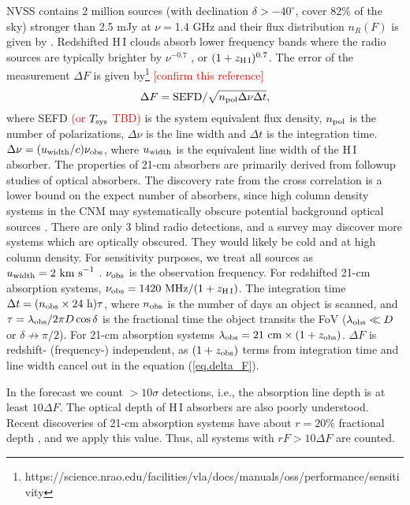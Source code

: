 \documentclass[]{raa}
\newcommand{\HI}{{H{\small\,I}}}
\newcommand{\tcr}{\textcolor{red}}
\begin{document}
NVSS contains 2 million sources (with declination $\delta >-40^\circ$,
cover 82\% of the sky) stronger than 2.5
mJy at $\nu=$1.4 GHz \citep{1998AJ....115.1693C} and their flux
distribution $n_R(F)$ is given by \cite{1984ApJ...287..461C}.
Redshifted {\HI} clouds absorb lower frequency bands where
the radio sources are typically brighter by $\nu^{-0.7}$
\citep{1998AJ....115.1693C}, or $(1+z_{\rm \HI})^{0.7}$.
The error of the measurement $\Delta F$ is given by\footnote{https://science.nrao.edu/facilities/vla/docs/manuals/oss/performance/sensitivity} \tcr{[confirm this reference]}
\begin{equation}\label{eq.delta_F}
    \Delta F={\rm SEFD}/\sqrt{n_{\rm pol}\Delta\nu\Delta t},
\end{equation}
where SEFD \tcr{(or $T_{\rm sys}$ TBD)} is the system equivalent flux density, $n_{\rm pol}$
is the number of polarizations, $\Delta\nu$ is the line width and
$\Delta t$ is the integration time. $\Delta\nu=(u_{\rm width}/c)\nu_{\rm obs}$,
where $u_{\rm width}$ is the equivalent line width of the {\HI}
absorber. The properties of 21-cm absorbers are primarily derived from
followup studies of optical absorbers. The discovery rate from the
cross correlation is a lower bound on the expect number of absorbers,
since high column density systems in the CNM may systematically
obscure potential background optical sources \citep{2014PhRvL.113d1303Y}. There are
only 3 blind radio detections, and a survey may discover more systems
which are optically obscured. They would likely be cold and at high
column density. For sensitivity purposes, we treat all sources as
$u_{\rm width}=2\ {\rm km\ s}^{-1}$
\citep{1982ApJ...259..495W,2005ARA&A..43..861W}.
$\nu_{\rm obs}$ is the observation frequency. For redshifted
21-cm absorption systems, $\nu_{\rm obs}=1420\ {\rm MHz}/(1+z_{\rm \HI})$.
The integration time $\Delta t=(n_{\rm obs}\times 24\ {\rm h})\tau$,
where $n_{\rm obs}$ is the number of days an object is scanned,
and $\tau=\lambda_{\rm obs}/2\pi D\cos\delta$ is the fractional time the object
transits the FoV ($\lambda_{\rm obs}\ll D$ or $\delta\nrightarrow\pi/2$).
For 21-cm absorption systems $\lambda_{\rm obs}=21\ {\rm cm}\times (1+z_{\rm obs})$.
$\Delta F$ is redshift- (frequency-) independent, as $(1+z_{\rm obs})$ terms
from integration time and line width cancel out
in the equation (\ref{eq.delta_F}).

In the forecast we count $>10\sigma$ detections, i.e., the absorption
line depth is at least $10\Delta F$. The optical depth of {\HI} absorbers
are also poorly understood. Recent discoveries of 21-cm absorption systems
have about $r=20\%$ fractional depth \citep{2015MNRAS.453.1249A,2015MNRAS.453.1268Z},
and we apply this value. Thus, all systems with $rF>10\Delta F$ are counted.
\end{document}
